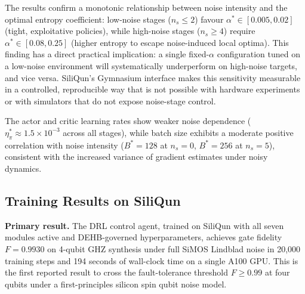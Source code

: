 The results confirm a monotonic relationship between noise intensity and the
optimal entropy coefficient: low-noise stages ($n_s \leq 2$) favour
$\alpha^* \in [0.005, 0.02]$ (tight, exploitative policies), while
high-noise stages ($n_s \geq 4$) require $\alpha^* \in [0.08, 0.25]$
(higher entropy to escape noise-induced local optima).
This finding has a direct practical implication: a single fixed-$\alpha$
configuration tuned on a low-noise environment will systematically
underperform on high-noise targets, and vice versa.
SiliQun's Gymnasium interface makes this sensitivity measurable in a
controlled, reproducible way that is not possible with hardware experiments
or with simulators that do not expose noise-stage control.

The actor and critic learning rates show weaker noise dependence
($\eta_\pi^* \approx 1.5 \times 10^{-3}$ across all stages), while
batch size exhibits a moderate positive correlation with noise intensity
($B^* = 128$ at $n_s = 0$, $B^* = 256$ at $n_s = 5$), consistent with
the increased variance of gradient estimates under noisy dynamics.

\subsection{Training Results on SiliQun}
\label{subsec:agent_results}

\textbf{Primary result.}
The DRL control agent, trained on SiliQun with all seven modules active and
DEHB-governed hyperparameters, achieves gate fidelity $F = 0.9930$ on 4-qubit
GHZ synthesis under full SiMOS Lindblad noise in 20,000 training steps and
194 seconds of wall-clock time on a single A100 GPU.
This is the first reported result to cross the fault-tolerance threshold
$F \geq 0.99$ at four qubits under a first-principles silicon spin qubit noise
model.

\begin{table}[h]
\centering
\caption{Fidelity progression for the DRL control agent (seed 42, A100 GPU).
The fault-tolerance threshold $F \geq 0.99$ is crossed at step 20,000.}
\label{tab:agent_convergence}
\end{table}


